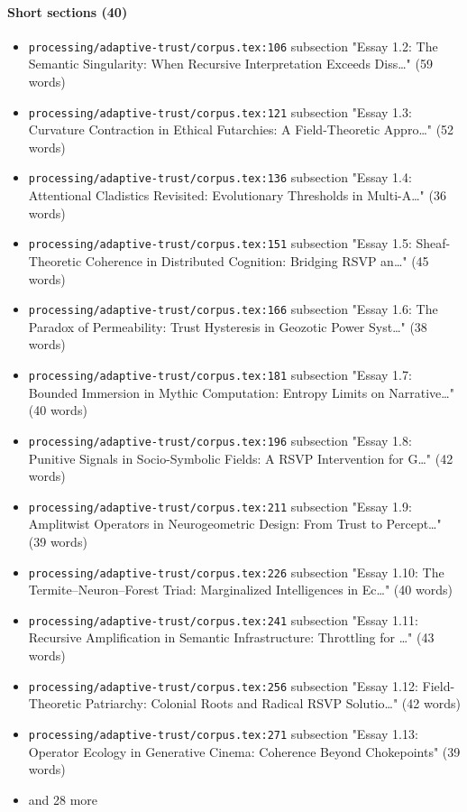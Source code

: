 \documentclass[11pt]{article}
\newcommand{\loc}[1]{{\small\color{muted}\texttt{#1}}}
\begin{document}
\paragraph{Short sections (40)}
\begin{itemize}
\item \loc{processing/\allowbreak{}adaptive-trust/\allowbreak{}corpus.tex:106} subsection "Essay 1.2: The Semantic Singularity: When Recursive Interpretation Exceeds Diss\ldots{}" (59 words)
\item \loc{processing/\allowbreak{}adaptive-trust/\allowbreak{}corpus.tex:121} subsection "Essay 1.3: Curvature Contraction in Ethical Futarchies: A Field-Theoretic Appro\ldots{}" (52 words)
\item \loc{processing/\allowbreak{}adaptive-trust/\allowbreak{}corpus.tex:136} subsection "Essay 1.4: Attentional Cladistics Revisited: Evolutionary Thresholds in Multi-A\ldots{}" (36 words)
\item \loc{processing/\allowbreak{}adaptive-trust/\allowbreak{}corpus.tex:151} subsection "Essay 1.5: Sheaf-Theoretic Coherence in Distributed Cognition: Bridging RSVP an\ldots{}" (45 words)
\item \loc{processing/\allowbreak{}adaptive-trust/\allowbreak{}corpus.tex:166} subsection "Essay 1.6: The Paradox of Permeability: Trust Hysteresis in Geozotic Power Syst\ldots{}" (38 words)
\item \loc{processing/\allowbreak{}adaptive-trust/\allowbreak{}corpus.tex:181} subsection "Essay 1.7: Bounded Immersion in Mythic Computation: Entropy Limits on Narrative\ldots{}" (40 words)
\item \loc{processing/\allowbreak{}adaptive-trust/\allowbreak{}corpus.tex:196} subsection "Essay 1.8: Punitive Signals in Socio-Symbolic Fields: A RSVP Intervention for G\ldots{}" (42 words)
\item \loc{processing/\allowbreak{}adaptive-trust/\allowbreak{}corpus.tex:211} subsection "Essay 1.9: Amplitwist Operators in Neurogeometric Design: From Trust to Percept\ldots{}" (39 words)
\item \loc{processing/\allowbreak{}adaptive-trust/\allowbreak{}corpus.tex:226} subsection "Essay 1.10: The Termite--Neuron--Forest Triad: Marginalized Intelligences in Ec\ldots{}" (40 words)
\item \loc{processing/\allowbreak{}adaptive-trust/\allowbreak{}corpus.tex:241} subsection "Essay 1.11: Recursive Amplification in Semantic Infrastructure: Throttling for \ldots{}" (43 words)
\item \loc{processing/\allowbreak{}adaptive-trust/\allowbreak{}corpus.tex:256} subsection "Essay 1.12: Field-Theoretic Patriarchy: Colonial Roots and Radical RSVP Solutio\ldots{}" (42 words)
\item \loc{processing/\allowbreak{}adaptive-trust/\allowbreak{}corpus.tex:271} subsection "Essay 1.13: Operator Ecology in Generative Cinema: Coherence Beyond Chokepoints" (39 words)
\item[] {\color{muted}\small and 28 more}
\end{itemize}
\end{document}
